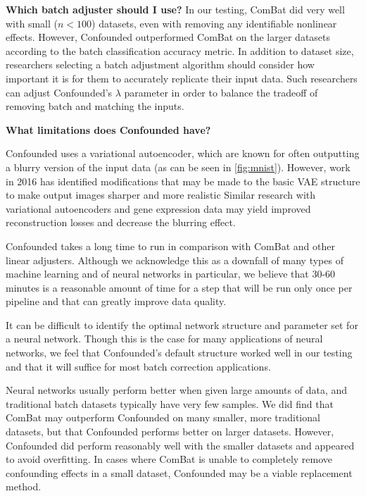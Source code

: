 \textbf{Which batch adjuster should I use?}
In our testing, ComBat did very well with small ($n < 100$) datasets, even with removing any identifiable nonlinear effects.
However, Confounded outperformed ComBat on the larger datasets according to the batch classification accuracy metric.
In addition to dataset size, researchers selecting a batch adjustment algorithm should consider how important it is for them to accurately replicate their input data.
Such researchers can adjust Confounded's $\lambda$ parameter in order to balance the tradeoff of removing batch and matching the inputs.

\textbf{What limitations does Confounded have?}
\begin{enumerate*}[(a)]
	\item Confounded uses a variational autoencoder, which are known for often outputting a blurry version of the input data (as can be seen in \figurename{} \ref{fig:mnist}).
	However, work in 2016 has identified modifications that may be made to the basic VAE structure to make output images sharper and more realistic \citep{hou_deep_2016}
	Similar research with variational autoencoders and gene expression data may yield improved reconstruction losses and decrease the blurring effect.
	\item Confounded takes a long time to run in comparison with ComBat and other linear adjusters.
	Although we acknowledge this as a downfall of many types of machine learning and of neural networks in particular, we believe that 30-60 minutes is a reasonable amount of time for a step that will be run only once per pipeline and that can greatly improve data quality.
	\item It can be difficult to identify the optimal network structure and parameter set for a neural network.
	Though this is the case for many applications of neural networks, we feel that Confounded's default structure worked well in our testing and that it will suffice for most batch correction applications.
	\item Neural networks usually perform better when given large amounts of data, and traditional batch datasets typically have very few samples.
	We did find that ComBat may outperform Confounded on many smaller, more traditional datasets, but that Confounded performs better on larger datasets.
	However, Confounded did perform reasonably well with the smaller datasets and appeared to avoid overfitting.
	In cases where ComBat is unable to completely remove confounding effects in a small dataset, Confounded may be a viable replacement method.
\end{enumerate*}


